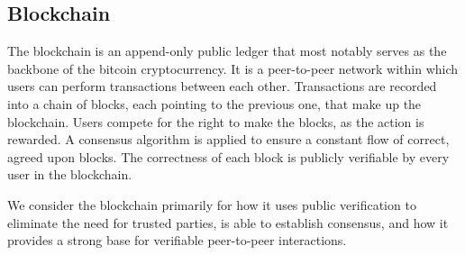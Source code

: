 \subsection{Blockchain}\label{subsec:blockchain}
The blockchain is an append-only public ledger that most notably serves as the backbone of the bitcoin cryptocurrency.
It is a peer-to-peer network within which users can perform transactions between each other.
Transactions are recorded into a chain of blocks, each pointing to the previous one, that make up the blockchain.
Users compete for the right to make the blocks, as the action is rewarded.
A consensus algorithm is applied to ensure a constant flow of correct, agreed upon blocks.
The correctness of each block is publicly verifiable by every user in the blockchain.

We consider the blockchain primarily for how it uses public verification to eliminate the need for trusted parties, is able to establish consensus, and how it provides a strong base for verifiable peer-to-peer interactions.
